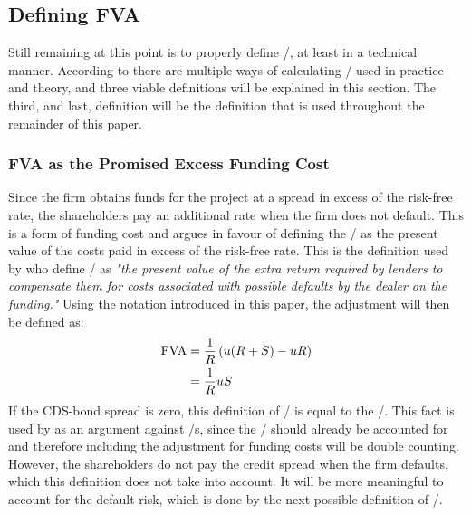 \documentclass[main.tex]{subfiles}
\begin{document}
    \subsection{Defining FVA}
    \label{sec:defining-fva}
        Still remaining at this point is to properly define \FVA/, at least in a technical manner.
        According to \textcite{ADS2019} there are multiple ways of calculating \FVA/ used in practice and theory,
        and three viable definitions will be explained in this section.
        The third, and last, definition will be the definition that is used throughout
        the remainder of this paper.

        \subsubsection*{FVA as the Promised Excess Funding Cost}
            Since the firm obtains funds for the project at a spread in excess of the risk-free rate, 
            the shareholders pay an additional rate when the firm does not default. 
            This is a form of funding cost and argues in favour of defining the \FVA/ as
            the present value of the costs paid in excess of the risk-free rate.
            This is the definition used by \textcite{HullWhiteFVA} who define \FVA/ as 
            \textit{%
                "the present value of the extra return required by lenders to compensate them 
                for costs associated with possible defaults by the dealer on the funding."
            }%
            Using the notation introduced in this paper, the adjustment will then be defined as:
                \begin{align}
                    \FVA/ 
                    &= 
                        \discountfactor \left(
                            u (\grossrfrate + S)
                            - u \grossrfrate
                        \right) 
                        \nonumber \\
                    &= 
                        \discountfactor u S
                    \label{eqn:fva-as-promised-excess-funding-cost}
                \end{align}
            \indent
            If the CDS-bond spread is zero, this definition of \FVA/ is equal to the \DVA/.
            This fact is used by \textcite{HullWhiteFVA} as an argument against \FVA/s,
            since the \DVA/ should already be accounted for and therefore including the adjustment
            for funding costs will be double counting.
            However, the shareholders do not pay the credit spread when the firm defaults,
            which this definition does not take into account.
            It will be more meaningful to account for the default risk, 
            which is done by the next possible definition of \FVA/.
\end{document}
